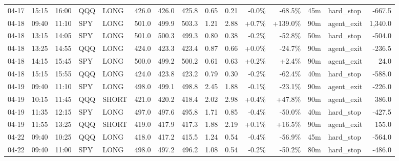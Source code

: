 \documentclass[11pt,a4paper,twoside]{article}
\begin{document}
\begin{landscape}
\begin{center}
\begin{longtable}{>{\color{txtmain}}l l l l l r r r r r r r r >{\color{txtmain}}l r}
04-17 & 15:15 & 16:00 & QQQ & LONG & 426.0 & 426.0 & 425.8 & 0.65 & 0.21 & \textcolor{lossred}{-0.0\%} & \textcolor{lossred}{-68.5\%} & 45m & hard\_stop & \textcolor{lossred}{-667.5} \\
04-18 & 09:40 & 11:10 & SPY & LONG & 501.0 & 499.9 & 503.3 & 1.21 & 2.88 & \textcolor{wingreen}{+0.7\%} & \textcolor{wingreen}{+139.0\%} & 90m & agent\_exit & \textcolor{wingreen}{1,340.0} \\
04-18 & 13:15 & 14:05 & SPY & LONG & 501.0 & 500.3 & 499.3 & 0.80 & 0.38 & \textcolor{lossred}{-0.2\%} & \textcolor{lossred}{-52.8\%} & 50m & hard\_stop & \textcolor{lossred}{-504.0} \\
04-18 & 13:25 & 14:55 & QQQ & LONG & 424.0 & 423.3 & 423.4 & 0.87 & 0.66 & \textcolor{wingreen}{+0.0\%} & \textcolor{lossred}{-24.7\%} & 90m & agent\_exit & \textcolor{lossred}{-236.5} \\
04-18 & 14:15 & 15:45 & SPY & LONG & 500.0 & 499.2 & 500.2 & 0.61 & 0.63 & \textcolor{wingreen}{+0.2\%} & \textcolor{wingreen}{+2.4\%} & 90m & agent\_exit & \textcolor{wingreen}{24.0} \\
04-18 & 15:15 & 15:55 & QQQ & LONG & 424.0 & 423.8 & 423.2 & 0.79 & 0.30 & \textcolor{lossred}{-0.2\%} & \textcolor{lossred}{-62.4\%} & 40m & hard\_stop & \textcolor{lossred}{-588.0} \\
04-19 & 09:40 & 11:10 & SPY & LONG & 498.0 & 499.1 & 498.8 & 2.45 & 1.88 & \textcolor{lossred}{-0.1\%} & \textcolor{lossred}{-23.1\%} & 90m & agent\_exit & \textcolor{lossred}{-226.0} \\
04-19 & 10:15 & 11:45 & QQQ & SHORT & 421.0 & 420.2 & 418.4 & 2.02 & 2.98 & \textcolor{wingreen}{+0.4\%} & \textcolor{wingreen}{+47.8\%} & 90m & agent\_exit & \textcolor{wingreen}{386.0} \\
04-19 & 11:35 & 12:15 & SPY & LONG & 497.0 & 497.6 & 495.8 & 1.71 & 0.85 & \textcolor{lossred}{-0.4\%} & \textcolor{lossred}{-50.0\%} & 40m & hard\_stop & \textcolor{lossred}{-427.5} \\
04-19 & 11:55 & 13:25 & QQQ & SHORT & 419.0 & 417.9 & 417.3 & 1.88 & 2.19 & \textcolor{wingreen}{+0.1\%} & \textcolor{wingreen}{+16.5\%} & 90m & agent\_exit & \textcolor{wingreen}{155.0} \\
04-22 & 09:40 & 10:25 & QQQ & LONG & 418.0 & 417.2 & 415.5 & 1.24 & 0.54 & \textcolor{lossred}{-0.4\%} & \textcolor{lossred}{-56.9\%} & 45m & hard\_stop & \textcolor{lossred}{-564.0} \\
04-22 & 09:40 & 11:00 & SPY & LONG & 498.0 & 497.2 & 496.2 & 1.08 & 0.54 & \textcolor{lossred}{-0.2\%} & \textcolor{lossred}{-50.2\%} & 80m & hard\_stop & \textcolor{lossred}{-486.0} \\

\end{longtable}
\end{center}
\end{landscape}
\end{document}
